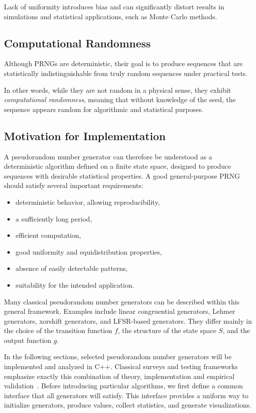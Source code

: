 Lack of uniformity introduces bias and can significantly distort results in simulations and statistical applications, such as Monte Carlo methods.

\subsection{Computational Randomness}

Although PRNGs are deterministic, their goal is to produce sequences that are statistically indistinguishable from truly random sequences under practical tests.

In other words, while they are not random in a physical sense, they exhibit \textit{computational randomness}, meaning that without knowledge of the seed, the sequence appears random for algorithmic and statistical purposes.

\subsection{Motivation for Implementation}

A pseudorandom number generator can therefore be understood as a deterministic algorithm defined on a finite state space, designed to produce sequences with desirable statistical properties. A good general-purpose PRNG should satisfy several important requirements:

\begin{itemize}
    \item deterministic behavior, allowing reproducibility,
    \item a sufficiently long period,
    \item efficient computation,
    \item good uniformity and equidistribution properties,
    \item absence of easily detectable patterns,
    \item suitability for the intended application.
\end{itemize}

Many classical pseudorandom number generators can be described within this general framework. Examples include linear congruential generators, Lehmer generators, xorshift generators, and LFSR-based generators. They differ mainly in the choice of the transition function $f$, the structure of the state space $S$, and the output function $g$.

In the following sections, selected pseudorandom number generators will be implemented and analyzed in C++. Classical surveys and testing frameworks emphasize exactly this combination of theory, implementation and empirical validation~\cite{hull1962random,lecuyer2007testu01}. Before introducing particular algorithms, we first define a common interface that all generators will satisfy. This interface provides a uniform way to initialize generators, produce values, collect statistics, and generate visualizations.

